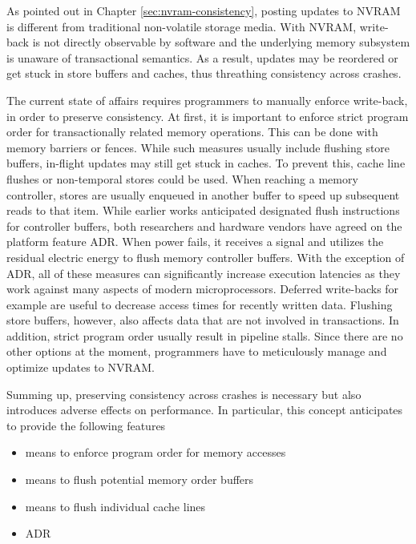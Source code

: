 As pointed out in Chapter \ref{sec:nvram-consistency}, posting updates to NVRAM
is different from traditional non-volatile storage media. With NVRAM, write-back
is not directly observable by software and the underlying memory subsystem is
unaware of transactional semantics. As a result, updates may be reordered or get
stuck in store buffers and caches, thus threathing consistency across crashes.

The current state of affairs requires programmers to manually enforce
write-back, in order to preserve consistency. At first, it is important to
enforce strict program order for transactionally related memory operations. This
can be done with memory barriers or fences. While such measures usually include
flushing store buffers, in-flight updates may still get stuck in caches. To
prevent this, cache line flushes or non-temporal stores could be used. When
reaching a memory controller, stores are usually enqueued in another buffer to
speed up subsequent reads to that item. While earlier works anticipated
designated flush instructions for controller buffers, both researchers and
hardware vendors have agreed on the platform feature ADR. When power fails, it
receives a signal and utilizes the residual electric energy to flush memory
controller buffers. With the exception of ADR, all of these measures can
significantly increase execution latencies as they work against many aspects of
modern microprocessors. Deferred write-backs for example are useful to decrease
access times for recently written data. Flushing store buffers, however, also
affects data that are not involved in transactions. In addition, strict program
order usually result in pipeline stalls. Since there are no other options at the
moment, programmers have to meticulously manage and optimize updates to NVRAM.

Summing up, preserving consistency across crashes is necessary but also
introduces adverse effects on performance. In particular, this concept
anticipates to provide the following features

\begin{itemize}
    \item means to enforce program order for memory accesses
    \item means to flush potential memory order buffers
    \item means to flush individual cache lines
    \item ADR
\end{itemize}
